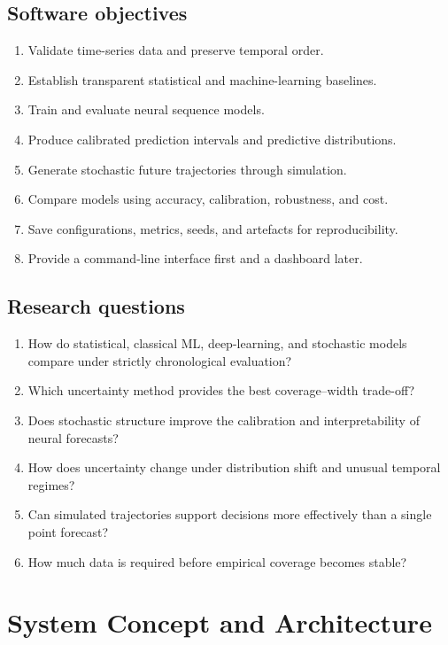 \documentclass[11pt,a4paper]{report}
\begin{document}
\section{Software objectives}
\begin{enumerate}[leftmargin=*]
\item Validate time-series data and preserve temporal order.
\item Establish transparent statistical and machine-learning baselines.
\item Train and evaluate neural sequence models.
\item Produce calibrated prediction intervals and predictive distributions.
\item Generate stochastic future trajectories through simulation.
\item Compare models using accuracy, calibration, robustness, and cost.
\item Save configurations, metrics, seeds, and artefacts for reproducibility.
\item Provide a command-line interface first and a dashboard later.
\end{enumerate}

\section{Research questions}
\begin{enumerate}[leftmargin=*]
\item How do statistical, classical ML, deep-learning, and stochastic models compare under strictly chronological evaluation?
\item Which uncertainty method provides the best coverage--width trade-off?
\item Does stochastic structure improve the calibration and interpretability of neural forecasts?
\item How does uncertainty change under distribution shift and unusual temporal regimes?
\item Can simulated trajectories support decisions more effectively than a single point forecast?
\item How much data is required before empirical coverage becomes stable?
\end{enumerate}

\chapter{System Concept and Architecture}
\end{document}
